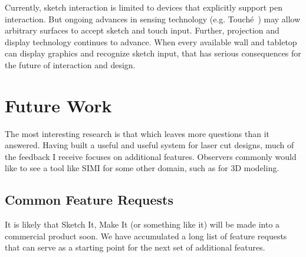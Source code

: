 Currently, sketch interaction is limited to devices that explicitly
support pen interaction. But ongoing advances in sensing technology
(e.g. Touch\'e~\cite{sato-touche}) may allow arbitrary surfaces to
accept sketch and touch input. Further, projection and display
technology continues to advance. When every available wall and
tabletop can display graphics and recognize sketch input, that has
serious consequences for the future of interaction and design.




\section{Future Work}

The most interesting research is that which leaves more questions than
it answered. Having built a useful and useful system for laser cut
designs, much of the feedback I receive focuses on additional
features. Observers commonly would like to see a tool like SIMI for
some other domain, such as for 3D modeling.

\subsection{Common Feature Requests}

It is likely that Sketch It, Make It (or something like it) will be
made into a commercial product soon. We have accumulated a long list of feature
requests that can serve as a starting point for the next set of
additional features. 

